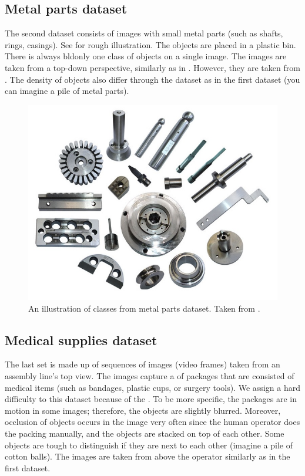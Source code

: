 \subsection*{Metal parts dataset}
The second dataset consists of images with small
metal parts (such as shafts, rings, casings). See  for
rough illustration. The objects are placed in a plastic bin. There is always
bld{only one class of objects on a single image}. The images are taken from a
top-down perspective, similarly as in . However, they
are taken from . The density of objects also differ through the
dataset as in the first dataset (you can imagine a pile of metal parts).

\begin{figure}[ht]
	\centering
	\includegraphics[height=0.5\linewidth]{Sources/Figures/metal_parts.jpg}
	\caption{An illustration of classes from metal parts dataset. Taken from
		\cite{parts}.}
	\label{fig:parts}
\end{figure}

\subsection*{Medical supplies dataset}
The last set is made up of sequences of images (video frames)
taken from an assembly line's top view. The images capture a  of
packages that are consisted of medical items (such as bandages, plastic cups, or
surgery tools). We assign a hard difficulty to this dataset because of the
. To be more specific, the packages are in motion in some
images; therefore, the objects are slightly blurred. Moreover, occlusion of
objects occurs in the image very often since the human operator does the packing
manually, and the objects are stacked on top of each other. Some objects are
tough to distinguish if they are next to each other (imagine a pile of cotton
balls). The images are taken from above the operator similarly as in the first
dataset.

